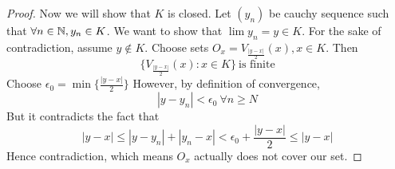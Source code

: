 \begin{enumerate}
\begin{proof}
              Now we will show that $K$ is closed. Let $(y_n)$ be cauchy sequence such that $\forall n \in {\mathbb{N}}, y_n \in K$. We want to show that $\lim y_n = y \in K$. For the sake of contradiction, assume $y \not\in K$. Choose sets $O_x = V_{\frac{|y-x|}{2}}(x), x \in K$. Then
              \[ \{V_{\frac{|y-x|}{2}}(x) : x \in K\} \ \text{is finite}\]
              Choose $\epsilon_0 = \min \{ \frac{|y-x|}{2}\}$
              However, by definition of convergence,
              \[ |y - y_n| < \epsilon_0 \ \forall n \ge N\]
              But it contradicts the fact that
              \[ |y- x| \le |y- y_n| + |y_n-x| < \epsilon_0 + \frac{|y-x|}{2}\le |y-x|\]
              Hence contradiction, which means $O_x$ actually does not cover our set.


          \end{proof}
\end{enumerate}
